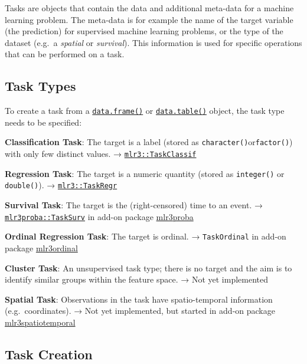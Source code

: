 \documentclass[]{scrbook}
\begin{document}
Tasks are objects that contain the data and additional meta-data for a machine learning problem.
The meta-data is for example the name of the target variable (the prediction) for supervised machine learning problems, or the type of the dataset (e.g.~a \emph{spatial} or \emph{survival}).
This information is used for specific operations that can be performed on a task.

\hypertarget{tasks-types}{%
\subsection{Task Types}\label{tasks-types}}

To create a task from a \href{https://www.rdocumentation.org/packages/base/topics/data.frame}{\texttt{data.frame()}} or \href{https://www.rdocumentation.org/packages/data.table/topics/data.table-package}{\texttt{data.table()}} object, the task type needs to be specified:

\textbf{Classification Task}: The target is a label (stored as \texttt{character()}or\texttt{factor()}) with only few distinct values.
→ \href{https://mlr3.mlr-org.com/reference/TaskClassif.html}{\texttt{mlr3::TaskClassif}}

\textbf{Regression Task}: The target is a numeric quantity (stored as \texttt{integer()} or \texttt{double()}).
→ \href{https://mlr3.mlr-org.com/reference/TaskRegr.html}{\texttt{mlr3::TaskRegr}}

\textbf{Survival Task}: The target is the (right-censored) time to an event.
→ \href{https://mlr3proba.mlr-org.com/reference/TaskSurv.html}{\texttt{mlr3proba::TaskSurv}} in add-on package \href{https://mlr3proba.mlr-org.com}{mlr3proba}

\textbf{Ordinal Regression Task}: The target is ordinal.
→ \texttt{TaskOrdinal} in add-on package \href{https://github.com/mlr-org/mlr3ordinal}{mlr3ordinal}

\textbf{Cluster Task}: An unsupervised task type; there is no target and the aim is to identify similar groups within the feature space.
→ Not yet implemented

\textbf{Spatial Task}: Observations in the task have spatio-temporal information (e.g.~coordinates).
→ Not yet implemented, but started in add-on package \href{https://mlr3spatiotemporal.mlr-org.com}{mlr3spatiotemporal}

\hypertarget{tasks-creation}{%
\subsection{Task Creation}\label{tasks-creation}}
\end{document}
